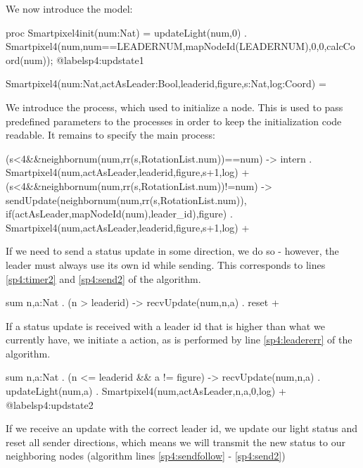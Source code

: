 We now introduce the model:

\begin{codeverb}
proc    Smartpixel4init(num:Nat) =
         updateLight(num,0) .
         Smartpixel4(num,num==LEADERNUM,mapNodeId(LEADERNUM),0,0,calcCoord(num));  @label{sp4:updstate1}

        Smartpixel4(num:Nat,actAsLeader:Bool,leaderid,figure,s:Nat,log:Coord) =
\end{codeverb}

We introduce the  process, which used to initialize a node. This is used to pass predefined parameters to the  processes in order to keep the initialization code readable. It remains to specify the main  process:

\begin{codeverb}
(s<4&&neighbornum(num,rr(s,RotationList.num))==num) -> intern .
    Smartpixel4(num,actAsLeader,leaderid,figure,s+1,log) +
(s<4&&neighbornum(num,rr(s,RotationList.num))!=num) ->
    sendUpdate(neighbornum(num,rr(s,RotationList.num)),
     if(actAsLeader,mapNodeId(num),leader_id),figure) .
    Smartpixel4(num,actAsLeader,leaderid,figure,s+1,log) +
\end{codeverb}

If we need to send a status update in some direction, we do so - however, the leader must always use its own id while sending. This corresponds to lines \ref{sp4:timer2} and \ref{sp4:send2} of the algorithm.

\begin{codeverb}
sum n,a:Nat . (n > leaderid) -> recvUpdate(num,n,a) . reset +
\end{codeverb}

If a status update is received with a leader id that is higher than what we currently have, we initiate a  action, as is performed by line \ref{sp4:leadererr} of the algorithm.

\begin{codeverb}
sum n,a:Nat . (n <= leaderid && a != figure) -> recvUpdate(num,n,a) .
        updateLight(num,a) .
        Smartpixel4(num,actAsLeader,n,a,0,log) + @label{sp4:updstate2}
\end{codeverb}

If we receive an update with the correct leader id, we update our light status and reset all sender directions, which means we will transmit the new status to our neighboring nodes (algorithm lines \ref{sp4:sendfollow} - \ref{sp4:send2})

